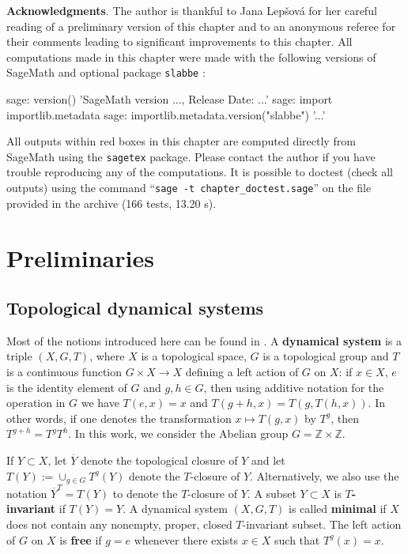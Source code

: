 \documentclass[12pt]{amsart}
\newcommand{\Z}{\mathbb{Z}}
\newcommand{\ifnv}[2]{\ifthenelse{\equal{#1}{}}{}{#2}}
\newcommand\defn[2][]{\ifnv{#1}{\index{#1|\textbf}}{\index{#2|\textbf}}\textbf{#2}}
\begin{document}
\textbf{Acknowledgments}.
The author is thankful to Jana Lepšová for her careful reading of a preliminary
version of this chapter and to an anonymous referee for their comments leading
to significant improvements to this chapter.
All computations made in this chapter were made with
the following versions of SageMath \cite{sagemathv10.4} and optional
package \texttt{slabbe} \cite{labbe_slabbe_0_7_6_2023}:
\begin{sagecommandlinetcb}
\begin{sagecommandline}
sage: version()
'SageMath version ..., Release Date: ...'
sage: import importlib.metadata
sage: importlib.metadata.version("slabbe")
'...'
\end{sagecommandline}
\end{sagecommandlinetcb}
All outputs within red boxes in this chapter are computed directly from SageMath using
the \texttt{sagetex} package. Please contact the author if you have trouble
reproducing any of the computations. It is possible
to doctest (check all outputs) using the command
``\texttt{sage -t chapter\_doctest.sage}'' on the file provided in the archive
(166 tests, 13.20 s).



\section{Preliminaries}\label{chap:Labbe:sec:Preliminaries}

\subsection{Topological dynamical systems}


Most of the notions introduced here can be found in \cite{MR648108}.
A \defn{dynamical system} is
a triple $(X,G,T)$, where $X$ is a topological space, $G$ is a topological
group and $T$ is a continuous function $G\times X\to X$ defining a left action
of $G$ on $X$:
if $x\in X$, $e$ is the identity element of $G$ and $g,h\in G$, then using
additive notation for the operation in $G$ we have $T(e,x)=x$
and $T(g+h,x)=T(g,T(h,x))$.
In other words, if one denotes the transformation $x\mapsto T(g,x)$
by $T^g$, then $T^{g+h}=T^g T^h$.
In this work, we consider the Abelian group $G=\Z\times\Z$.

If $Y\subset X$, let $\overline{Y}$ denote the topological closure of $Y$ and
let $T(Y):=\cup_{g\in G}T^g(Y)$ denote the $T$-closure of $Y$.
Alternatively, we also use the notation $\overline{Y}^T=T(Y)$ to denote the $T$-closure of $Y$.
A subset $Y\subset X$ is \defn{$T$-invariant} if $T(Y)=Y$.
A dynamical system $(X,G,T)$ is called \defn{minimal} if $X$ does
not contain any nonempty, proper, closed $T$-invariant subset.
The left action of $G$ on $X$ is \defn{free}
if $g=e$ whenever there exists $x\in X$ such that $T^g(x)=x$.
\end{document}
